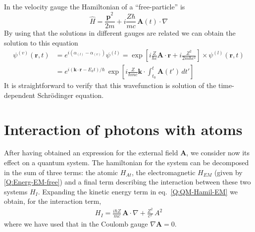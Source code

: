 In the velocity gauge the Hamiltonian of a ``free-particle'' is
\begin{equation*}
  \hat{H} = \frac{\hat{\bm{p}}^{2}}{2m} + i \frac{Z \hbar}{m c}\, \bm{A}(t) \cdot \nabla
\end{equation*}
By using that the solutions in different gauges are related we can obtain the solution to this equation
\begin{align}
  \psi^{(v)}(\bm{r},t) &= e^{i (\alpha_{(l)} - \alpha_{(v)})} \psi^{(l)} = \exp{\left[i \frac{Z}{\hbar c} \bm{A} \cdot \bm{r} + i \frac{Z^{2}}{2 m \hbar c^{2}}  \right]} \times \psi^{(l)}(\bm{r},t) \\
&= e^{i (\bm{k}\cdot \bm{r} - E_{k}t)/\hbar} \, \exp{\left[ i \frac{Z}{\hbar m c} \bm{k} \cdot \int_{t_{0}}^{t} \bm{A}(t') \, dt' \right]}
\end{align}
%
It is straightforward to verify that this wavefunction is solution of the time-dependent Schr\"{o}dinger equation.

\section{Interaction of photons with atoms}

After having obtained an expression for the external field $\bm{A}$, we consider now its effect on a quantum system. The hamiltonian for the system can be decomposed in the sum of three terms: the atomic $H_{At}$, the electromagnetic $H_{EM}$ (given by \ref{Q:Energ-EM-free}) and a final term describing the interaction between these two systems $H_{I}$. Expanding the kinetic energy term in eq.~\ref{Q:QM-Hamil-EM} we obtain, for the interaction term,
%
\begin{eqnarray}\label{Q:H_int-EM}
H_{I} = \frac{i \hbar Z}{m c}\, \bm{A} \cdot \nabla +
\frac{Z^{2}}{c^{2}} \, A^{2}
\end{eqnarray}
%
where we have used that in the Coulomb gauge $\nabla \bm{A}=0$.

